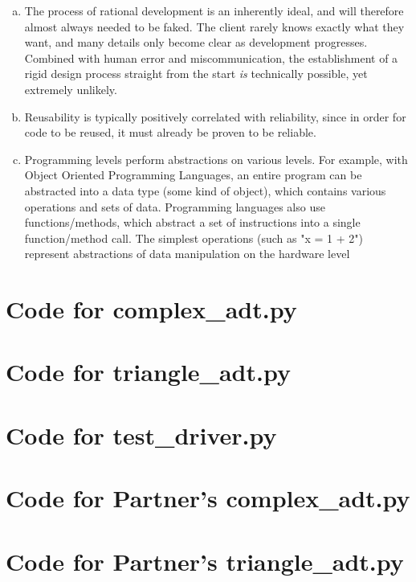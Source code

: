\documentclass[12pt]{article}
\begin{document}
\begin{enumerate}[(a)]
\item The process of rational development is an inherently ideal, and will therefore almost always needed to be faked. The client rarely knows exactly what they want, and many details only become clear as development progresses. Combined with human error and miscommunication, the establishment of a rigid design process straight from the start \textit{is} technically possible, yet extremely unlikely.
\item Reusability is typically positively correlated with reliability, since in order for code to be reused, it must already be proven to be reliable.
\item Programming levels perform abstractions on various levels. For example, with Object Oriented Programming Languages, an entire program can be abstracted into a data type (some kind of object), which contains various operations and sets of data. Programming languages also use functions/methods, which abstract a set of instructions into a single function/method call. The simplest operations (such as "x = 1 + 2") represent abstractions of data manipulation on the hardware level %

\end{enumerate}

\newpage

\lstset{language=Python, basicstyle=\tiny, breaklines=true, showspaces=false,
  showstringspaces=false, breakatwhitespace=true}

\def\thesection{\Alph{section}}

\section{Code for complex\_adt.py}

\noindent 

\newpage

\section{Code for triangle\_adt.py}

\noindent 

\newpage

\section{Code for test\_driver.py}

\noindent 

\newpage

\section{Code for Partner's complex\_adt.py}

\noindent 

\section{Code for Partner's triangle\_adt.py}

\noindent 
\end{document}
